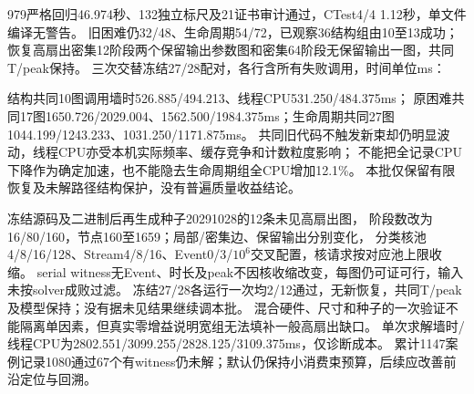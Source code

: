 \documentclass[UTF8,a4paper,11pt,fontset=fandol]{ctexart}
\begin{document}
979严格回归46.974秒、132独立标尺及21证书审计通过，CTest4/4 1.12秒，单文件编译无警告。
旧困难仍32/48、生命周期54/72，已观察36结构组由10至13成功；
恢复高扇出密集12阶段两个保留输出参数图和密集64阶段无保留输出一图，共同T/peak保持。
三次交替冻结27/28配对，各行含所有失败调用，时间单位ms：
\par\smallskip{}\par\smallskip

结构共同10图调用墙时526.885/\allowbreak{}494.213、线程CPU531.250/\allowbreak{}484.375ms；
原困难共同17图1650.726/\allowbreak{}2029.004、1562.500/\allowbreak{}1984.375ms；生命周期共同27图1044.199/\allowbreak{}1243.233、1031.250/\allowbreak{}1171.875ms。
共同旧代码不触发新束却仍明显波动，线程CPU亦受本机实际频率、缓存竞争和计数粒度影响；
不能把全记录CPU下降作为确定加速，也不能隐去生命周期组全CPU增加12.1\%。
本批仅保留有限恢复及未解路径结构保护，没有普遍质量收益结论。

冻结源码及二进制后再生成种子20291028的12条未见高扇出图，
阶段数改为16/80/160，节点160至1659；局部/密集边、保留输出分别变化，
分类核池4/8/16/128、Stream4/8/16、Event0/3/$10^6$交叉配置，核请求按对应池上限收缩。
serial witness无Event、时长及peak不因核收缩改变，每图仍可证可行，输入未按solver成败过滤。
冻结27/28各运行一次均2/12通过，无新恢复，共同T/peak及模型保持；没有据未见结果继续调本批。
混合硬件、尺寸和种子的一次验证不能隔离单因素，但真实零增益说明宽组无法填补一般高扇出缺口。
单次求解墙时/线程CPU为2802.551/\allowbreak{}3099.255/\allowbreak{}2828.125/\allowbreak{}3109.375ms，仅诊断成本。
累计1147案例记录1080通过67个有witness仍未解；默认仍保持小消费束预算，后续应改善前沿定位与回溯。
\end{document}
